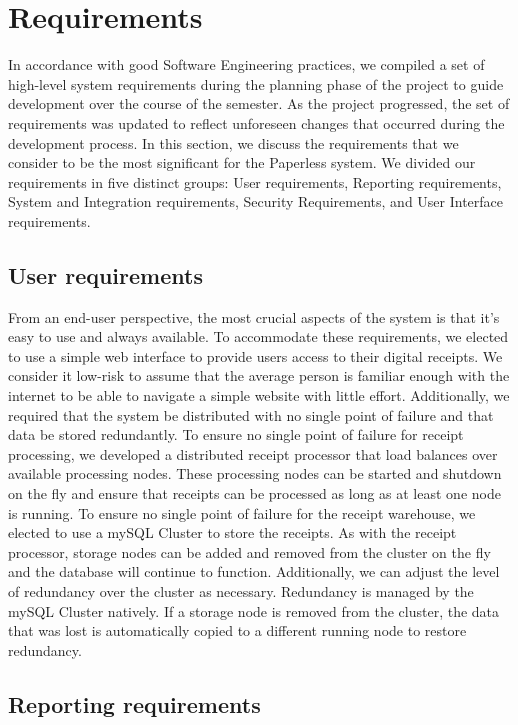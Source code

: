 \section{Requirements}
\label{sec:requirements}
In accordance with good Software Engineering practices, we compiled a set of high-level system requirements during the planning phase of the project to guide development over the course of the semester.  As the project progressed, the set of requirements was updated to reflect unforeseen changes that occurred during the development process.  In this section, we discuss the requirements that we consider to be the most significant for the Paperless system.  We divided our requirements in five distinct groups: User requirements, Reporting requirements, System and Integration requirements, Security Requirements, and User Interface requirements.

\subsection{User requirements}
\label{sec:requirements.user}

From an end-user perspective, the most crucial aspects of the system is that it's easy to use and always available.  To accommodate these requirements, we elected to use a simple web interface to provide users access to their digital receipts.  We consider it low-risk to assume that the average person is familiar enough with the internet to be able to navigate a simple website with little effort.  Additionally, we required that the system be distributed with no single point of failure and that data be stored redundantly.  To ensure no single point of failure for receipt processing, we developed a distributed receipt processor that load balances over available processing nodes.  These processing nodes can be started and shutdown on the fly and ensure that receipts can be processed as long as at least one node is running.  To ensure no single point of failure for the receipt warehouse, we elected to use a mySQL Cluster to store the receipts.  As with the receipt processor, storage nodes can be added and removed from the cluster on the fly and the database will continue to function.  Additionally, we can adjust the level of redundancy over the cluster as necessary.  Redundancy is managed by the mySQL Cluster natively.  If a storage node is removed from the cluster, the data that was lost is automatically copied to a different running node to restore redundancy.

\subsection{Reporting requirements}
\label{sec:requirements.reporting}

